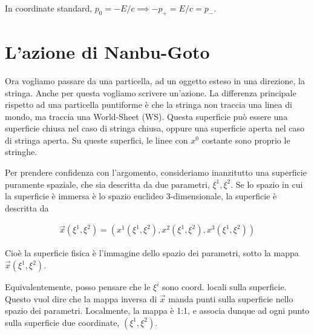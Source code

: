 \documentclass{report}
\begin{document}
In coordinate standard, \(p_0 = -E/c \implies -p_+ = E/c = p_-\).  

\section{L'azione di Nanbu-Goto}

Ora vogliamo passare da una particella, ad un oggetto esteso in una direzione, la stringa. Anche per questa vogliamo scrivere un'azione. La differenza principale rispetto ad una particella puntiforme è che la stringa non traccia una linea di mondo, ma traccia una World-Sheet (WS). Questa superficie può essere una superficie chiusa nel caso di stringa chiusa, oppure una superficie aperta nel caso di stringa aperta. Su queste superfici, le linee con \(x^0\) costante sono proprio le stringhe. 

Per prendere confidenza con l'argomento, consideriamo inanzitutto una superficie puramente spaziale, che sia descritta da due parametri, \(\xi^1, \xi^2\). Se lo spazio in cui la superficie è immersa è lo spazio euclideo 3-dimensionale, la superficie è descritta da 

\begin{align}
    \vec{x}(\xi^1, \xi^2) = (x^1(\xi^1, \xi^2), x^2(\xi^1, \xi^2), x^3(\xi^1, \xi^2)) 
\end{align}

Cioè la superficie fisica è l'immagine dello spazio dei parametri, sotto la mappa \(\vec{x}(\xi^1, \xi^2)\). 

Equivalentemente, posso pensare che le \(\xi^i\) sono coord. locali sulla superficie. Questo vuol dire che la mappa inversa di \(\vec{x}\) manda punti sulla superficie nello spazio dei parametri. Localmente, la mappa è 1:1, e associa dunque ad ogni punto sulla superficie due coordinate, \((\xi^1, \xi^2)\). 
\end{document}
